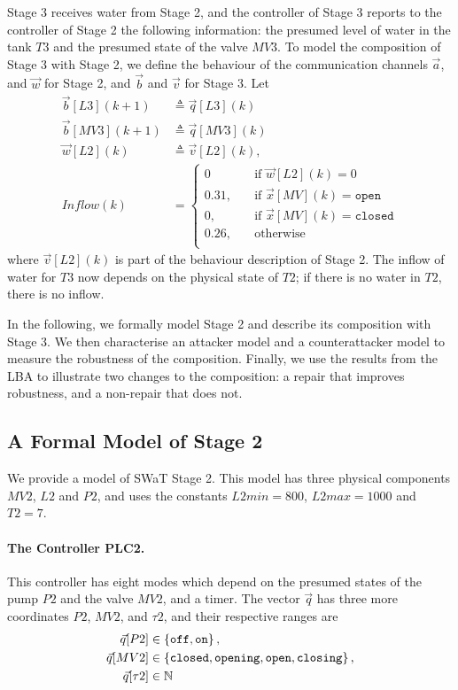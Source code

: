 {Stage 3 receives water from Stage 2, and the controller of Stage 3 reports to the controller of Stage 2 the following information: the presumed level of water in the tank $T3$ and the presumed state of the valve $MV3$. To model the composition of Stage 3 with Stage 2, we define the behaviour of the communication channels $\vec{a}$, and $\vec{w}$ for Stage 2, and $\vec{b}$ and $\vec{v}$ for Stage 3. Let  
\begin{align}
  \vec{b}[L3](k+1)&\triangleq \vec{q}[L3](k)\\
  \vec{b}[MV3](k+1)&\triangleq \vec{q}[MV3](k)\\
  \vec{w}[L2](k)&\triangleq \vec{v}[L2](k),\\
  Inflow(k)&=\begin{cases}
    0 & \quad \text{if $\vec{w}[L2](k)=0$}\\
    0.31,&\quad \text{if $\vec{x}[MV](k)=\texttt{open}$}\\
    0,&\quad \text{if $\vec{x}[MV](k)=\texttt{closed}$}\\
    0.26,&\quad \text{otherwise}\\
  \end{cases}
\end{align}
where $\vec{v}[L2](k)$ is part of the behaviour description of Stage 2. The inflow of water for $T3$ now depends on the physical state of $T2$; if there is no water in $T2$, there is no inflow.

In the following, we formally model Stage 2 and describe its composition with Stage 3. We then characterise an attacker model and a counterattacker model to measure the robustness of the composition. Finally, we use the results from the LBA to illustrate two changes to the composition: a repair that improves robustness, and a non-repair that does not.

\subsection{A Formal Model of Stage 2}
We provide a model of SWaT Stage 2. This model has three physical components $MV2$, $L2$ and $P2$, and uses the constants $L2min=800$, $L2max=1000$ and $T2=7$.

\paragraph{The Controller PLC2.} 
This controller has eight modes which depend on the presumed states of the pump $P2$ and the valve $MV2$, and a timer. The vector $\vec{q}$ has three more coordinates $P2$, $MV2$, and $\tau2$, and their respective ranges are 
\begin{align*}
  \vec{q}[P2]&\in\left\{\texttt{off},\texttt{on}\right\},\\
  \vec{q}[MV2]&\in\left\{\texttt{closed},\texttt{opening},\texttt{open},\texttt{closing}\right\},\\
  \vec{q}[\tau2]&\in\mathbb{N}
\end{align*}

}
